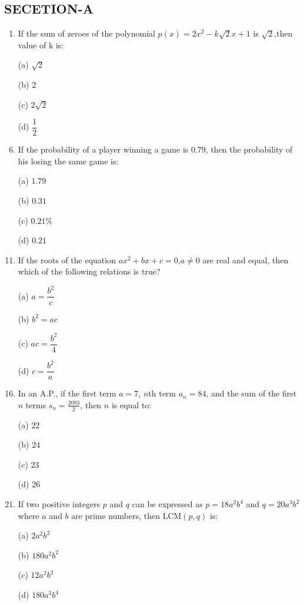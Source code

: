 \documentclass[12pt,-letter paper]{article}
\providecommand{\brak}[1]{\ensuremath{\left(#1\right)}}
\providecommand{\brak}[1]{\ensuremath{\left(#1\right)}}
\begin{document}
\begin{center}
        \section*{SECETION-A}
\end{center}
\begin{enumerate}

\item If the sum of zeroes of the polynomial $ p\brak x = 2x^2 - k\sqrt2x+1 $ is ${\sqrt2} $,then value of k is:
    \item[(a)] $ \sqrt{2} $
    \item[(b)] $2$
    \item[(c)] $ 2  \sqrt{2} $
    \item[(d)] $ \dfrac{1}{2} $

\item If the probability of a player winning a game is 0.79, then the probability of his losing the same game is:
    \item[(a)] $1.79$
    \item[(b)] $0.31$
    \item[(c)] $0.21\% $                                                                                                                                      \item[(d)] $0.21$

\item If the roots of the equation $ax^2 + bx + c = 0$,$a \neq 0$ are real and equal, then which of the following relations is true?
    \item[(a)] $a = \dfrac{b^2}{c}$
    \item[(b)] $b^2 = ac$                                                                                                                                     \item[(c)] $ac = \dfrac{b^2}{4}$
    \item[(d)] $c = \dfrac{b^2}{a}$

\item In an A.P., if the first term $a = 7$, $n$th term $a_{n} = 84$, and the sum of the first $n$ terms $s_{n} = \frac{2093}{2}$, then $n$ is equal to:
    \item[(a)] $22$
    \item[(b)] $24$
    \item[(c)] $23$
    \item[(d)] $26$

\item If two positive integers $p$ and $q$ can be expressed as $p = 18a^2 b^4$ and $q = 20a^3 b^2$ where $a$ and $b$ are prime numbers, then $\text{LCM}(p, q)$ is:
    \item[(a)] $2a^2 b^2$
    \item[(b)] $180a^2 b^2$
    \item[(c)] $12a^2  b^2$
    \item[(d)] $180a^3 b^4$


\end{enumerate}
\end{document}
